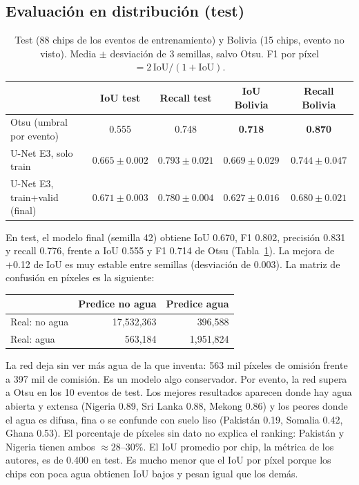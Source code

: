 \documentclass{article}
\begin{document}
\subsection{Evaluación en distribución (test)}

\begin{table}[t]
  \caption{Test (88 chips de los eventos de entrenamiento) y Bolivia (15 chips, evento no visto). Media $\pm$ desviación de 3 semillas, salvo Otsu. F1 por píxel $= 2\,\mathrm{IoU}/(1+\mathrm{IoU})$.}
  \label{tab:test}
  \centering
  \small
  \begin{tabular}{lcccc}
    \toprule
    & IoU test & Recall test & IoU Bolivia & Recall Bolivia \\
    \midrule
    Otsu (umbral por evento) & 0.555 & 0.748 & \textbf{0.718} & \textbf{0.870} \\
    U-Net E3, solo train & $0.665 \pm 0.002$ & $0.793 \pm 0.021$ & $0.669 \pm 0.029$ & $0.744 \pm 0.047$ \\
    U-Net E3, train+valid (final) & $\mathbf{0.671 \pm 0.003}$ & $0.780 \pm 0.004$ & $0.627 \pm 0.016$ & $0.680 \pm 0.021$ \\
    \bottomrule
  \end{tabular}
\end{table}

En test, el modelo final (semilla 42) obtiene IoU 0.670, F1 0.802, precisión 0.831 y recall 0.776, frente a IoU 0.555 y F1 0.714 de Otsu (Tabla~\ref{tab:test}). La mejora de +0.12 de IoU es muy estable entre semillas (desviación de 0.003). La matriz de confusión en píxeles es la siguiente:
\begin{center}
\small
\begin{tabular}{lrr}
  \toprule
  & Predice no agua & Predice agua \\
  \midrule
  Real: no agua & 17,532,363 & 396,588 \\
  Real: agua & 563,184 & 1,951,824 \\
  \bottomrule
\end{tabular}
\end{center}
La red deja sin ver más agua de la que inventa: 563 mil píxeles de omisión frente a 397 mil de comisión. Es un modelo algo conservador. Por evento, la red supera a Otsu en los 10 eventos de test. Los mejores resultados aparecen donde hay agua abierta y extensa (Nigeria 0.89, Sri Lanka 0.88, Mekong 0.86) y los peores donde el agua es difusa, fina o se confunde con suelo liso (Pakistán 0.19, Somalia 0.42, Ghana 0.53). El porcentaje de píxeles sin dato no explica el ranking: Pakistán y Nigeria tienen ambos $\approx 28$--$30\%$. El IoU promedio por chip, la métrica de los autores, es de 0.400 en test. Es mucho menor que el IoU por píxel porque los chips con poca agua obtienen IoU bajos y pesan igual que los demás.
\end{document}
